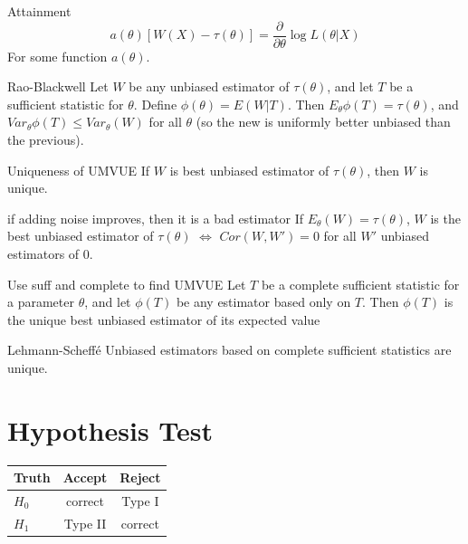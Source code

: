 \documentclass{article}
\begin{document}
\begin{multicols*}{3}
\begin{thmbox}{Attainment}
$$
a(\theta)\left[W(X) - \tau(\theta)\right] = \frac{\partial}{\partial\theta}\log L(\theta|X)
$$
For some function $a(\theta)$.

\end{thmbox}

\begin{thmbox}{Rao-Blackwell}
Let $W$ be any unbiased estimator of $\tau(\theta)$, and let $T$ be a sufficient statistic for $\theta$. Define $\phi(\theta) = E(W|T)$. Then $E_\theta\phi(T) = \tau(\theta)$, and $Var_\theta\phi(T)\leq Var_\theta(W)$ for all $\theta$ (so the new is uniformly better unbiased than the previous).
\end{thmbox}

\begin{thmbox}{Uniqueness of UMVUE}
If $W$ is best unbiased estimator of $\tau(\theta)$, then $W$ is unique.
\end{thmbox}

\begin{thmbox}{if adding noise improves, then it is a bad estimator}
If $E_\theta(W)=\tau(\theta)$, $W$ is the best unbiased estimator of $\tau(\theta)$ $\iff$ $Cor(W,W') = 0$ for all $W'$ unbiased estimators of 0. 
\end{thmbox}

\begin{thmbox}{Use suff and complete to find UMVUE}
Let $T$ be a complete sufficient statistic for a parameter $\theta$, and let $\phi(T)$ be any estimator based only on $T$. Then $\phi(T)$ is the unique best unbiased estimator of its expected value
\end{thmbox}


\begin{thmbox}{Lehmann-Scheff\'e}
Unbiased estimators based on complete sufficient statistics are unique.
\end{thmbox}


\section{Hypothesis Test}

\begin{tabular}{lcc}
\toprule Truth & Accept & Reject \\ \midrule
$H_0$ & correct & Type I\\
$H_1$ & Type II & correct \\ \bottomrule
\end{tabular}




\end{multicols*}
\end{document}
